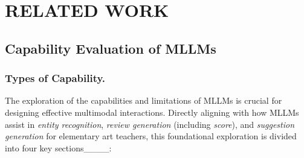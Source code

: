 \section{RELATED WORK}
\subsection{Capability Evaluation of MLLMs}
\subsubsection{Types of Capability.}
The exploration of the capabilities and limitations of MLLMs is crucial for designing effective multimodal interactions. Directly aligning with how MLLMs assist in \textit{entity recognition}, \textit{review generation} (including \textit{score}), and \textit{suggestion generation} for elementary art teachers, this foundational exploration is divided into four key sections____:
